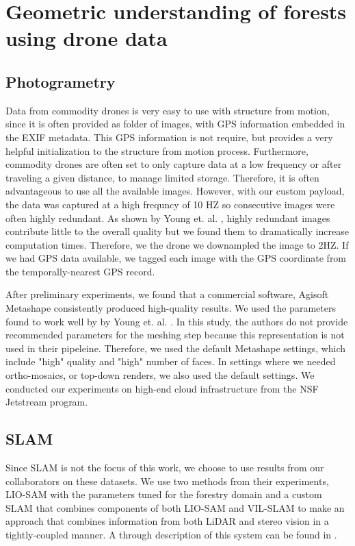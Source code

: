 \section{Geometric understanding of forests using drone data}
\subsection{Photogrametry}
Data from commodity drones is very easy to use with structure from motion, since it is often provided as folder of images, with GPS information embedded in the EXIF metadata. This GPS information is not require, but provides a very helpful initialization to the structure from motion process. Furthermore, commodity drones are often set to only capture data at a low frequency or after traveling a given distance, to manage limited storage. Therefore, it is often advantageous to use all the available images. However, with our custom payload, the data was captured at a high frequncy of 10 HZ so consecutive images were often highly redundant. As shown by Young et. al. \cite{Young2022}, highly redundant images contribute little to the overall quality but we found them to dramatically increase computation times. Therefore, we the drone we downampled the image to 2HZ. If we had GPS data available, we tagged each image with the GPS coordinate from the temporally-nearest GPS record.   

After preliminary experiments, we found that a commercial software, Agisoft Metashape consistently produced high-quality results. We used the parameters found to work well by by Young et. al. \cite{Young2022}. In this study, the authors do not provide recommended parameters for the meshing step because this representation is not used in their pipeleine. Therefore, we used the default Metashape settings, which include "high" quality and "high" number of faces. In settings where we needed ortho-mosaics, or top-down renders, we also used the default settings. We conducted our experiments on high-end cloud infrastructure from the NSF Jetstream \cite{} program. 



\subsection{SLAM}    
Since SLAM is not the focus of this work, we choose to use results from our collaborators on these datasets. We use two methods from their experiments, LIO-SAM \cite{Shan2020LIO-SAM:Mapping} with the parameters tuned for the forestry domain and a custom SLAM that combines components of both LIO-SAM and VIL-SLAM \cite{Shao2019StereoMapping} to make an approach that combines information from both LiDAR and stereo vision in a tightly-coupled manner. A through description of this system can be found in \cite{RussellUnmannedMitigation}.


